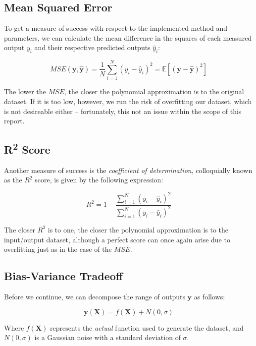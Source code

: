 \documentclass[a4paper,10pt,english]{article}
\begin{document}
\subsection{Mean Squared Error}

To get a measure of success with respect to the implemented method and parameters, we can calculate the mean difference in the squares of each measured output $y_i$ and their respective predicted outputs $\hat{y}_i$:

\begin{equation}
MSE(\mathbf{y}, \mathbf{\hat{y}}) = \frac{1}{N} \sum_{i=1}^{N} (y_i - \hat{y}_i)^2 = \mathbb{E}\left[(\mathbf{y}-\hat{\mathbf{y}})^{2}\right]
\end{equation}

The lower the $MSE$, the closer the polynomial approximation is to the original dataset.  If it is too low, however, we run the risk of overfitting our dataset, which is not desireable either – fortunately, this not an issue within the scope of this report.

\subsection{R\textsuperscript{2} Score}

Another measure of success is the \textit{coefficient of determination}, colloquially known as the $R^2$ score, is given by the following expression:

\begin{equation}
R^2 = 1 - \frac{\sum_{i=1}^N (y_i - \hat{y}_i)^2 }{\sum_{i=1}^N (y_i - \bar{y}_i)^2 }
\end{equation}

The closer $R^2$ is to one, the closer the polynomial approximation is to the input/output dataset, although a perfect score can once again arise due to overfitting just as in the case of the $MSE$.

\subsection{Bias-Variance Tradeoff}

Before we continue, we can decompose the range of outputs $\mathbf{y}$ as follows:

\begin{equation}
\label{eq_method_5}
\mathbf{y}(\mathbf{X}) = f(\mathbf{X}) + N(0, \sigma) 
\end{equation}

Where $f(\mathbf{X})$ represents the \textit{actual} function used to generate the dataset, and $N(0,\sigma)$ is a Gaussian noise with a standard deviation of $\sigma$.
\end{document}
